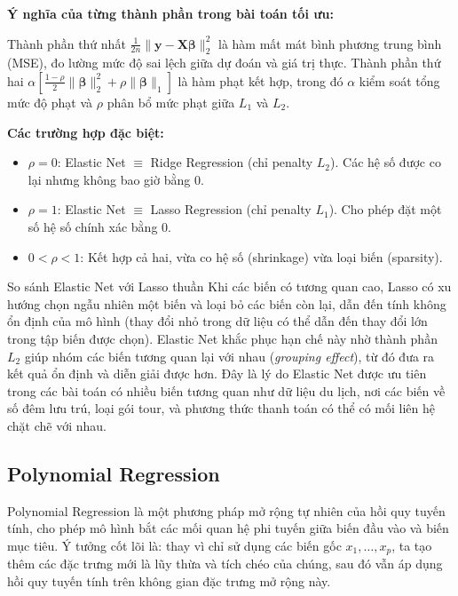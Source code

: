 \documentclass[12pt,a4paper]{article}
\begin{document}
\textbf{Ý nghĩa của từng thành phần trong bài toán tối ưu:}

Thành phần thứ nhất $\frac{1}{2n}\|\mathbf{y} - \mathbf{X}\boldsymbol{\beta}\|_2^2$ là hàm mất mát bình phương trung bình (MSE), đo lường mức độ sai lệch giữa dự đoán và giá trị thực. Thành phần thứ hai $\alpha\left[\frac{1-\rho}{2}\|\boldsymbol{\beta}\|_2^2 + \rho\|\boldsymbol{\beta}\|_1\right]$ là hàm phạt kết hợp, trong đó $\alpha$ kiểm soát tổng mức độ phạt và $\rho$ phân bổ mức phạt giữa $L_1$ và $L_2$.

\textbf{Các trường hợp đặc biệt:}
\begin{itemize}[leftmargin=1.5em]
    \item $\rho = 0$: Elastic Net $\equiv$ Ridge Regression (chỉ penalty $L_2$). Các hệ số được co lại nhưng không bao giờ bằng 0.
    \item $\rho = 1$: Elastic Net $\equiv$ Lasso Regression (chỉ penalty $L_1$). Cho phép đặt một số hệ số chính xác bằng 0.
    \item $0 < \rho < 1$: Kết hợp cả hai, vừa co hệ số (shrinkage) vừa loại biến (sparsity).
\end{itemize}

\begin{remarkbox}{So sánh Elastic Net với Lasso thuần}
Khi các biến có tương quan cao, Lasso có xu hướng chọn ngẫu nhiên một biến và loại bỏ các biến còn lại, dẫn đến tính không ổn định của mô hình (thay đổi nhỏ trong dữ liệu có thể dẫn đến thay đổi lớn trong tập biến được chọn). Elastic Net khắc phục hạn chế này nhờ thành phần $L_2$ giúp nhóm các biến tương quan lại với nhau (\textit{grouping effect}), từ đó đưa ra kết quả ổn định và diễn giải được hơn. Đây là lý do Elastic Net được ưu tiên trong các bài toán có nhiều biến tương quan như dữ liệu du lịch, nơi các biến về số đêm lưu trú, loại gói tour, và phương thức thanh toán có thể có mối liên hệ chặt chẽ với nhau.
\end{remarkbox}

\subsection{Polynomial Regression}

Polynomial Regression là một phương pháp mở rộng tự nhiên của hồi quy tuyến tính, cho phép mô hình bắt các mối quan hệ phi tuyến giữa biến đầu vào và biến mục tiêu. Ý tưởng cốt lõi là: thay vì chỉ sử dụng các biến gốc $x_1, \ldots, x_p$, ta tạo thêm các đặc trưng mới là lũy thừa và tích chéo của chúng, sau đó vẫn áp dụng hồi quy tuyến tính trên không gian đặc trưng mở rộng này.
\end{document}
